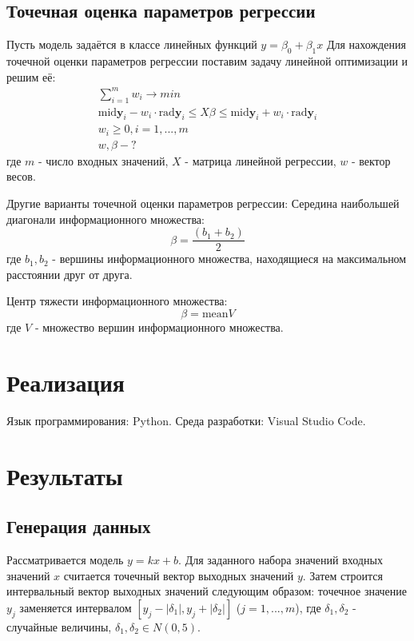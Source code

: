 \documentclass[a4paper,12pt]{article}
\begin{document}
    \subsection{Точечная оценка параметров регрессии}
    Пусть модель задаётся в классе линейных функций $ y = \beta_{0} + \beta_{1}x $
    Для нахождения точечной оценки параметров регрессии поставим задачу линейной оптимизации и решим её:
    \begin{gather}
        \sum_{i = 1}^{m}w_{i} \to min \\
        \text{mid}\textbf{y}_{i} - w_{i} \cdot \text{rad}\textbf{y}_{i} \leq X\beta \leq \text{mid}\textbf{y}_{i} + w_{i} \cdot \text{rad}\textbf{y}_{i} \\
        w_{i} \geq 0, i = 1, ..., m \\
        w, \beta - ?
    \end{gather}
    где $ m $ - число входных значений, $ X $ - матрица линейной регрессии, $ w $ - вектор весов. \newline

    \noindent
    Другие варианты точечной оценки параметров регрессии: \newline
    Середина наибольшей диагонали информационного множества:
    \begin{equation}
        \beta = \frac{(b_{1} + b_{2})}{2}
    \end{equation}
    где $ b_{1}, b_{2} $ - вершины информационного множества, находящиеся на максимальном расстоянии друг от друга.\newline

    \noindent
    Центр тяжести информационного множества:
    \begin{equation}
        \beta = \text{mean}V
    \end{equation}
    где $ V $ - множество вершин информационного множества.
    
    \section{Реализация}
    Язык программирования: Python. Среда разработки: Visual Studio Code.

    \section{Результаты}
    \subsection{Генерация данных}
    Рассматривается модель $ y = kx + b $. Для заданного набора значений входных значений $ x $ считается точечный вектор выходных значений $ y $.
    Затем строится интервальный вектор выходных значений следующим образом: точечное значение $ y_{j} $ заменяется интервалом $ [y_{j} - |\delta_{1}|, y_{j} + |\delta_{2}|] $ ($ j = 1, ..., m $),
    где $ \delta_{1}, \delta_{2} $ - случайные величины, $ \delta_{1}, \delta_{2} \in N(0, 5) $.
    
\end{document}
